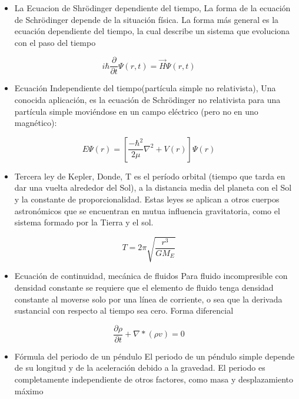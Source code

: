 \documentclass[12pt, letterpaper]{article}
\begin{document}
\begin{itemize}
\item[\spadesuit] La Ecuacion de Shrödinger dependiente del tiempo, 
La forma de la ecuación de Schrödinger depende de la situación física. La forma más general es la ecuación dependiente del tiempo, la cual describe un sistema que evoluciona con el paso del tiempo
\end{itemize}
$$ i \hbar \frac{\partial}{\partial t} \Psi (r,t) = \vec{H} \Psi (r, t)$$
\begin{itemize}
\item [\star]Ecuación Independiente del tiempo(partícula simple no relativista), Una conocida aplicación, es la ecuación de Schrödinger no relativista para una partícula simple moviéndose en un campo eléctrico (pero no en uno magnético):
\end{itemize}
$$ E \Psi (r) = [\frac{-\hbar^2}{2\mu}\nabla^2 + V(r)] \Psi (r)$$


\begin{itemize}
\item [\bigstar]Tercera ley de Kepler, Donde, T es el período orbital (tiempo que tarda en dar una vuelta alrededor del Sol), a  la distancia media del planeta con el Sol y la constante de proporcionalidad.
Estas leyes se aplican a otros cuerpos astronómicos que se encuentran en mutua influencia gravitatoria, como el sistema formado por la Tierra y el sol.
\end{itemize}

$$T = 2\pi \sqrt{\frac{r^3}{GM_E}}$$

\begin{itemize}
\item[\textsection] Ecuación de continuidad, mecánica de fluidos
Para fluido incompresible con densidad constante se requiere que el elemento de fluido tenga densidad constante al moverse solo por una línea de corriente, o sea que la derivada sustancial con respecto al tiempo sea cero.
Forma diferencial
\end{itemize}

$$ \frac{\partial\rho}{\partial t} + \nabla * (\rho v) = 0$$

\begin{itemize}
\item[\clubsuit] Fórmula del periodo de un péndulo 
El periodo de un péndulo simple depende de su longitud y de la aceleración debido a la gravedad. El periodo es completamente independiente de otros factores, como masa y desplazamiento máximo
\end{itemize}
\end{document}
